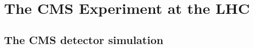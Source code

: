 \chapter{The CMS Experiment at the LHC}
\label{ch:CMS}

    

     
    
\section{The CMS detector simulation}
    

